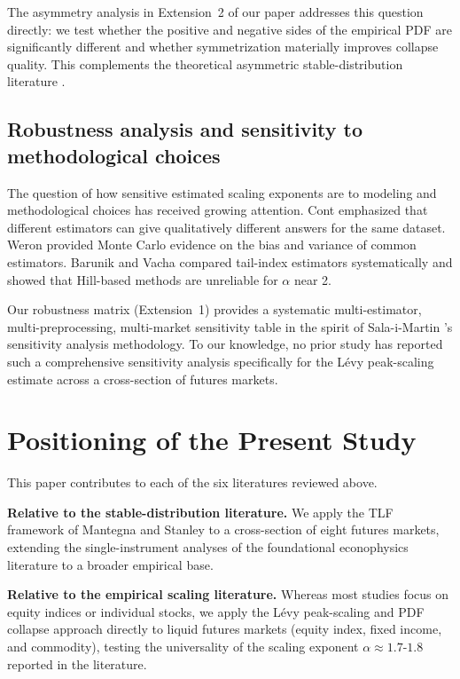 \documentclass[12pt,a4paper]{article}
\begin{document}
The asymmetry analysis in Extension~2 of our paper addresses this question
directly: we test whether the positive and negative sides of the empirical PDF
are significantly different and whether symmetrization materially improves
collapse quality. This complements the theoretical asymmetric stable-distribution
literature \cite{Zolotarev1986,Nolan2001}.

\subsection{Robustness analysis and sensitivity to methodological choices}

The question of how sensitive estimated scaling exponents are to modeling
and methodological choices has received growing attention. Cont \cite{Cont2001}
emphasized that different estimators can give qualitatively different answers
for the same dataset. Weron \cite{Weron2001} provided Monte Carlo evidence on the
bias and variance of common estimators. Barunik and Vacha \cite{Barunik2010} compared
tail-index estimators systematically and showed that Hill-based methods
are unreliable for $\alpha$ near 2.

Our robustness matrix (Extension~1) provides a systematic multi-estimator,
multi-preprocessing, multi-market sensitivity table in the spirit of
Sala-i-Martin \cite{Sala-i-Martin1997}'s sensitivity analysis methodology. To our
knowledge, no prior study has reported such a comprehensive sensitivity analysis
specifically for the Lévy peak-scaling estimate across a cross-section of
futures markets.


\section{Positioning of the Present Study}
\label{sec:position}

This paper contributes to each of the six literatures reviewed above.

\textbf{Relative to the stable-distribution literature.} We apply the
TLF framework of Mantegna and Stanley \cite{MantegnaStanley1994,MantegnaStanley1995} to a
cross-section of eight futures markets, extending the single-instrument analyses
of the foundational econophysics literature to a broader empirical base.

\textbf{Relative to the empirical scaling literature.} Whereas most
studies focus on equity indices or individual stocks, we apply the Lévy
peak-scaling and PDF collapse approach directly to liquid futures markets
(equity index, fixed income, and commodity), testing the universality of
the scaling exponent $\alpha \approx 1.7$-$1.8$ reported in the literature.
\end{document}
